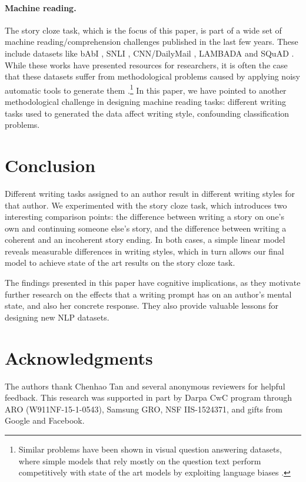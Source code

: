 \documentclass[11pt,a4paper]{article}
\newcommand{\isectionb}[1]{\section{#1}\label{ssec:#1}}
\newcommand{\nascomment}[1]{{\color{blue}\textsc{[#1 --nas]}}}
\begin{document}
\paragraph{Machine reading.}
The  story cloze task, which is the focus of this paper, is part of a wide set of machine reading/comprehension challenges published in the last few years.
These include datasets like bAbI \cite{Weston:2015}, SNLI \cite{bowman2015large}, CNN/DailyMail \cite{hermann2015teaching}, LAMBADA \cite{Paperno:2016} and SQuAD \cite{rajpurkar2016squad}. 
While these works have presented resources for researchers, 
it is often the case that these datasets suffer from methodological
problems caused by applying noisy automatic tools to generate them
\cite{Chen:2016}.\footnote{Similar problems have been shown in visual
  question answering datasets, where simple models that rely mostly on
  the question text perform competitively with state of the art models
  by exploiting language biases
  \cite{Zhou:2015,Jabri:2016}.}
In this paper, we have pointed to another methodological challenge in
designing machine reading tasks:  different writing tasks
used to generated the data affect writing style, confounding classification problems.

\isectionb{Conclusion}

Different writing tasks assigned to an author result in different
writing styles for that author.
We experimented with the story cloze task, which introduces two interesting comparison points: 
 the difference between writing a story on one's own and continuing someone else's story,
 and the difference between writing a coherent and an incoherent story ending.
In both cases, a simple linear model reveals measurable differences in writing styles, 
which in turn allows our final 
model to achieve state of the art results on the story cloze task.

The findings presented in this paper have  cognitive implications, as
they motivate further research on the effects that a writing
prompt has on an author's mental state, and also her concrete response.
They also provide valuable lessons for designing new NLP datasets.

\section{Acknowledgments}
The authors thank Chenhao Tan and several anonymous reviewers for helpful feedback. %
This research was supported in part by Darpa CwC program through ARO (W911NF-15-1-0543), Samsung GRO, NSF IIS-1524371, and gifts from Google and Facebook.




\end{document}
